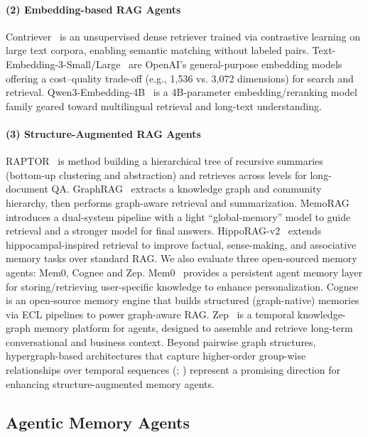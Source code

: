 \paragraph{ (2) Embedding-based RAG Agents} Contriever~\citep{contriever} is an unsupervised dense retriever trained via contrastive learning on large text corpora, enabling semantic matching without labeled pairs.  Text-Embedding-3-Small/Large~\citep{openai2024text} are OpenAI’s general-purpose embedding models offering a cost–quality trade-off (e.g., 1,536 vs. 3,072 dimensions) for search and retrieval. Qwen3-Embedding-4B~\citep{qwen3_embedding} is a 4B-parameter embedding/reranking model family geared toward multilingual retrieval and long-text understanding.

\paragraph{ (3) Structure-Augmented RAG Agents}  RAPTOR~\citep{sarthi2024raptor} is method building a hierarchical tree of recursive summaries (bottom-up clustering and abstraction) and retrieves across levels for long-document QA. GraphRAG~\citep{graphrag} extracts a knowledge graph and community hierarchy, then performs graph-aware retrieval and summarization. MemoRAG~\citep{memorag} introduces a dual-system pipeline with a light “global-memory” model to guide retrieval and a stronger model for final answers. HippoRAG-v2~\citep{hipporag-v2} extends hippocampal-inspired retrieval to improve factual, sense-making, and associative memory tasks over standard RAG. We also evaluate three open-sourced memory agents: Mem0, Cognee and Zep. Mem0~\citep{Mem0} provides a persistent agent memory layer for storing/retrieving user-specific knowledge to enhance personalization. Cognee~\citep{cognee} is an open-source memory engine that builds structured (graph-native) memories via ECL pipelines to power graph-aware RAG. Zep~\citep{Zep} is a temporal knowledge-graph memory platform for agents, designed to assemble and retrieve long-term conversational and business context. Beyond pairwise graph structures, hypergraph-based architectures that capture higher-order group-wise relationships over temporal sequences (\cite{tan2025h3m}; \cite{tan2025magnet}) represent a promising direction for enhancing structure-augmented memory agents.


\subsection{Agentic Memory Agents}

